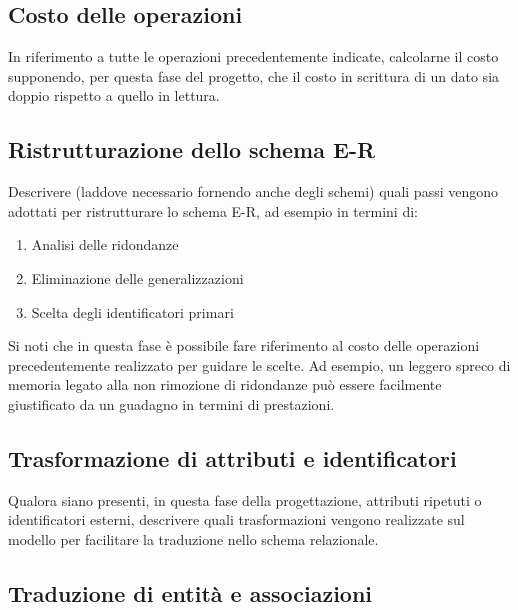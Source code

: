 \subsection*{Costo delle operazioni}

\begin{templateblock}
    In riferimento a tutte le operazioni precedentemente indicate, calcolarne
    il costo supponendo, per questa fase del progetto, che il costo in
    scrittura di un dato sia doppio rispetto a quello in lettura.
\end{templateblock}

\subsection*{Ristrutturazione dello schema E-R}

\begin{templateblock}
    Descrivere (laddove necessario fornendo anche degli schemi) quali passi
    vengono adottati per ristrutturare lo schema E-R, ad esempio in
    termini di:
    \begin{enumerate}
        \item Analisi delle ridondanze
        \item Eliminazione delle generalizzazioni
        \item Scelta degli identificatori primari
    \end{enumerate}
    Si noti che in questa fase è possibile fare riferimento al costo delle
    operazioni precedentemente realizzato per guidare le scelte.
    Ad esempio, un leggero spreco di memoria legato alla non rimozione di
    ridondanze può essere facilmente giustificato da un guadagno in termini
    di prestazioni.
\end{templateblock}

\subsection*{Trasformazione di attributi e identificatori}

\begin{templateblock}
    Qualora siano presenti, in questa fase della progettazione, attributi
    ripetuti o identificatori esterni, descrivere quali trasformazioni
    vengono realizzate sul modello per facilitare la traduzione nello
    schema relazionale.
\end{templateblock}

\subsection*{Traduzione di entità e associazioni}


